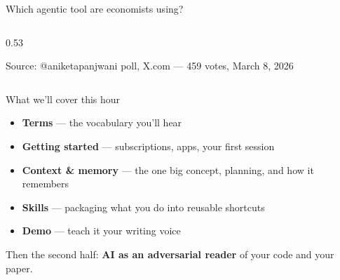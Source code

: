 \documentclass[aspectratio=169, 10pt]{beamer}
\begin{document}
\begin{frame}{Which agentic tool are economists using?}
\begin{columns}[T]
\begin{column}{0.53\textwidth}
{%
}
\vskip3pt
{\tiny\color{CoolGray} Source: @aniketapanjwani poll, X.com --- 459 votes, March 8, 2026}
\end{column}
\end{columns}
\end{frame}


\begin{frame}{What we'll cover this hour}
\vskip10pt
\begin{itemize}\setlength{\itemsep}{11pt}
  \item[\color{SlateTeal}\textbf{1.}] \textbf{Terms} --- the vocabulary you'll hear
  \item[\color{SlateTeal}\textbf{2.}] \textbf{Getting started} --- subscriptions, apps, your first session
  \item[\color{SlateTeal}\textbf{3.}] \textbf{Context \& memory} --- the one big concept, planning, and how it remembers
  \item[\color{SlateTeal}\textbf{4.}] \textbf{Skills} --- packaging what you do into reusable shortcuts
  \item[\color{SlateTeal}\textbf{5.}] \textbf{Demo} --- teach it your writing voice
\end{itemize}
\vskip10pt
\begin{tcolorbox}[accentbox, halign=center, top=3pt, bottom=3pt]
\small Then the second half: \textbf{AI as an adversarial reader} of your code and your paper.
\end{tcolorbox}
\end{frame}
\end{document}
